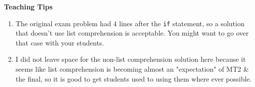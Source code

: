     \begin{questionmeta}
        \textbf{Teaching Tips}
        \begin{enumerate}
                \item The original exam problem had 4 lines after the \lstinline{if} statement, so a solution that doesn't use list comprehension is acceptable. You might want to go over that case with your students.
                \item I did not leave space for the non-list comprehension solution here because it seems like list comprehension is becoming almost an "expectation" of MT2 \& the final, so it is good to get students used to using them where ever possible.
        \end{enumerate}
    \end{questionmeta}